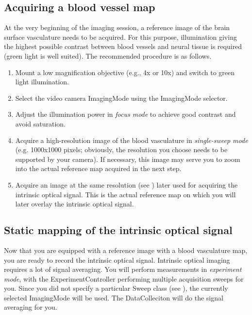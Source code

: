 \subsection{Acquiring a blood vessel map}\label{sec:intrinsic_protocol_bloodVesselMap}
At the very beginning of the imaging session, a reference image of the brain surface vasculature needs to be acquired. For this purpose, illumination giving the highest possible contrast between blood vessels and neural tissue is required (green light is well suited). The recommended procedure is as follows.
\begin{enumerate}
	\item Mount a low magnification objective (e.g., 4x or 10x) and switch to green light illumination.
	\item Select the video camera ImagingMode using the ImagingMode selector.
	\item Adjust the illumination power in \textit{focus mode} to achieve good contrast and avoid saturation.
	\item Acquire a high-resolution image of the blood vasculature in \textit{single-sweep mode} (e.g. 1000x1000 pixels; obviously, the resolution you choose needs to be supported by your camera). If necessary, this image may serve you to zoom into the actual reference map acquired in the next step.
	\item Acquire an image at the same resolution (see ) later used for acquiring the intrinsic optical signal. This is the actual reference map on which you will  later overlay the intrinsic optical signal.
\end{enumerate}

\subsection{Static mapping of the intrinsic optical signal}\label{sec:ios_protocol_staticMapping}
Now that you are equipped with a reference image with a blood vasculature map, you are ready to record the intrinsic optical signal. Intrinsic optical imaging requires a lot of signal averaging. You will perform measurements in \textit{experiment mode}, with the ExperimentController performing multiple acquisition sweeps for you. Since you did not specify a particular Sweep class (see ), the currently selected ImagingMode will be used. The DataColleciton will do the signal averaging for you. 

